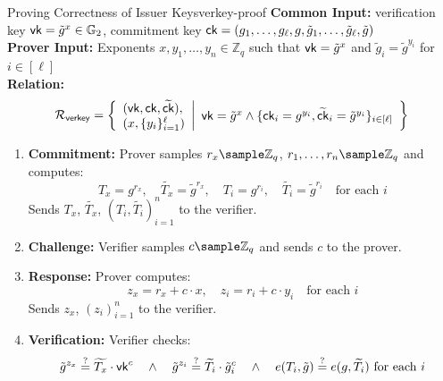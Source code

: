\begin{protocol}{Proving Correctness of Issuer Keys}{verkey-proof}\label{prot:verkey_proof}
\textbf{Common Input:} verification key $\mathsf{vk} = \tilde{g}^x \in \mathbb{G}_2$, commitment key $\mathsf{ck} = (g_1, \dots, g_{\ell}, g, \tilde{g}_1, \dots, \tilde{g}_{\ell}, \tilde{g})$ \\
\textbf{Prover Input:} Exponents $x, y_1, \dots, y_n \in \mathbb{Z}_q$ such that $\mathsf{vk} = \tilde{g}^x$ and $\tilde{g}_i = \tilde{g}^{y_i}$ for $i \in [\ell]$\\
\textbf{Relation:} 
\[
\mathcal{R}_{\mathsf{verkey}} = \left\{
\begin{array}{l}
    (\vk, \ck, \widetilde{\ck}),\\
    (x, \{y_i\}_{i=1}^\ell)
\end{array}
 \middle|
 \begin{array}{l}
      \vk = \tilde{g}^x \wedge \{\ck_i = g^{y_i}, \widetilde{\ck}_i = \tilde{g}^{y_i}\}_{i \in [\ell]}       %
 \end{array}
  \right\}
\]
\begin{enumerate}
    \item \textbf{Commitment:} Prover samples $r_x \sample \mathbb{Z}_q$, $r_1, \dots, r_n \sample \mathbb{Z}_q$ and computes:
    \[
    T_{x} = g^{r_x}, \quad \widetilde{T_{x}} = \tilde{g}^{r_x}, \quad T_{i} = g^{r_i}, \quad \widetilde{T_{i}} = \tilde{g}^{r_i} \quad \text{for each } i
    \]
    Sends $T_{x}$, $\widetilde{T_{x}}$, $(T_{i}, \widetilde{T_{i}})_{i=1}^n$ to the verifier.

    \item \textbf{Challenge:} Verifier samples $c \sample \mathbb{Z}_q$ and sends $c$ to the prover.

    \item \textbf{Response:} Prover computes:
    \[
    z_x = r_x + c \cdot x, \quad z_i = r_i + c \cdot y_i \quad \text{for each } i
    \]
    Sends $z_x$, $(z_i)_{i=1}^n$ to the verifier.

    \item \textbf{Verification:} Verifier checks:
    \[
    \tilde{g}^{z_x} \stackrel{?}{=} \widetilde{T_{x}} \cdot \mathsf{vk}^c \quad \wedge \quad \tilde{g}^{z_i} \stackrel{?}{=} \widetilde{T_{i}} \cdot \tilde{g}_i^c \quad \wedge \quad e(T_{i}, \tilde{g}) \stackrel{?}{=} e(g, \widetilde{T_{i}}) \text{ for each $i$}
    \]
\end{enumerate}
\end{protocol}

